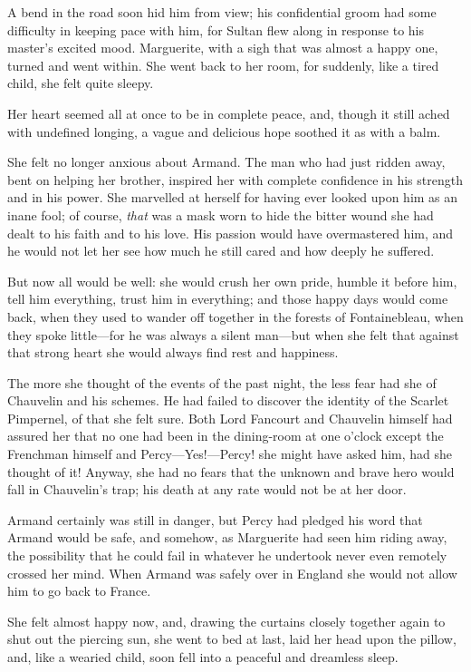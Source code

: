 A bend in the road soon hid him from view; his confidential groom had some difficulty in keeping pace with him, for Sultan flew along in response to his master's excited mood. Marguerite, with a sigh that was almost a happy one, turned and went within. She went back to her room, for suddenly, like a tired child, she felt quite sleepy.

Her heart seemed all at once to be in complete peace, and, though it still ached with undefined longing, a vague and delicious hope soothed it as with a balm.

She felt no longer anxious about Armand. The man who had just ridden away, bent on helping her brother, inspired her with complete confidence in his strength and in his power. She marvelled at herself for having ever looked upon him as an inane fool; of course, \textit{that} was a mask worn to hide the bitter wound she had dealt to his faith and to his love. His passion would have overmastered him, and he would not let her see how much he still cared and how deeply he suffered.

But now all would be well: she would crush her own pride, humble it before him, tell him everything, trust him in everything; and those happy days would come back, when they used to wander off together in the forests of Fontainebleau, when they spoke little\allowbreak---\allowbreak for he was always a silent man\allowbreak---\allowbreak but when she felt that against that strong heart she would always find rest and happiness.

The more she thought of the events of the past night, the less fear had she of Chauvelin and his schemes. He had failed to discover the identity of the Scarlet Pimpernel, of that she felt sure. Both Lord Fancourt and Chauvelin himself had assured her that no one had been in the dining-room at one o'clock except the Frenchman himself and Percy\allowbreak---\allowbreak Yes!\allowbreak---\allowbreak Percy! she might have asked him, had she thought of it! Anyway, she had no fears that the unknown and brave hero would fall in Chauvelin's trap; his death at any rate would not be at her door.

Armand certainly was still in danger, but Percy had pledged his word that Armand would be safe, and somehow, as Marguerite had seen him riding away, the possibility that he could fail in whatever he undertook never even remotely crossed her mind. When Armand was safely over in England she would not allow him to go back to France.

She felt almost happy now, and, drawing the curtains closely together again to shut out the piercing sun, she went to bed at last, laid her head upon the pillow, and, like a wearied child, soon fell into a peaceful and dreamless sleep.